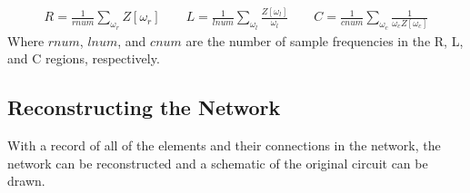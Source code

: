 \documentclass[11pt,twoside]{mitthesis}
\begin{document}
\begin{align*}
R=\frac{1}{rnum}\sum_{\omega_r}{Z[\omega_r]} \qquad
L=\frac{1}{lnum}\sum_{\omega_l}{\frac{Z[\omega_l]}{\omega_l} \qquad}
C=\frac{1}{cnum}\sum_{\omega_c}{\frac{1}{\omega_c Z[\omega_c]}}
\end{align*}
Where $rnum$, $lnum$, and $cnum$ are the number of sample frequencies in the R, L, and C regions, respectively.

\subsection{Reconstructing the Network}
With a record of all of the elements and their connections in the network, the network can be reconstructed and a schematic of the original circuit can be drawn.

\ifdefined\DEBUG
\end{document}
